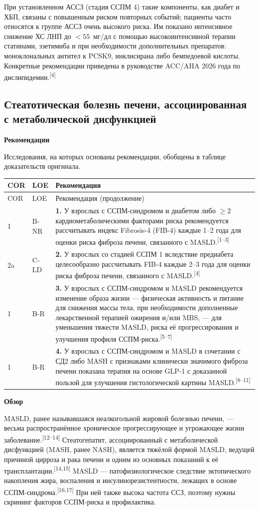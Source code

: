 \documentclass[11pt,a4paper]{article}
\newcommand{\src}[1]{\textsuperscript{[#1]}}
\newcommand{\heading}[1]{\par\medskip\textbf{#1}\par}
\begin{document}
При установленном АССЗ (стадия ССПМ 4) такие компоненты, как диабет и ХБП, связаны с повышенным риском повторных событий; пациенты часто относятся к группе АССЗ очень высокого риска. Им показано интенсивное снижение ХС ЛНП до $<55$~мг/дл с помощью высокоинтенсивной терапии статинами, эзетимиба и при необходимости дополнительных препаратов: моноклональных антител к PCSK9, инклисирана либо бемпедоевой кислоты. Конкретные рекомендации приведены в руководстве ACC/AHA 2026 года по дислипидемии.\src{4}

\subsection{Стеатотическая болезнь печени, ассоциированная с метаболической дисфункцией}
\heading{Рекомендации}
Исследования, на которых основаны рекомендации, обобщены в таблице доказательств оригинала.
{\small
\begin{longtable}{P{0.07\textwidth}P{0.11\textwidth}P{0.75\textwidth}}
\toprule COR & LOE & Рекомендация\\\midrule
\endfirsthead
\toprule COR & LOE & Рекомендация (продолжение)\\\midrule
{} & B-NR & \textbf{1.} У взрослых с ССПМ-синдромом и диабетом либо $\geq2$ кардиометаболическими факторами риска рекомендуется рассчитывать индекс Fibrosis-4 (FIB-4) каждые 1--2 года для оценки риска фиброза печени, связанного с MASLD.\src{1--3}\\[5pt]
2a & C-LD & \textbf{2.} У взрослых со стадией ССПМ 1 вследствие предиабета целесообразно рассчитывать FIB-4 каждые 2--3 года для оценки риска фиброза печени, связанного с MASLD.\src{4}\\[5pt]
1 & B-R & \textbf{3.} У взрослых с ССПМ-синдромом и MASLD рекомендуется изменение образа жизни --- физическая активность и питание для снижения массы тела, при необходимости дополненные лекарственной терапией ожирения и/или MBS, --- для уменьшения тяжести MASLD, риска её прогрессирования и улучшения профиля ССПМ-риска.\src{5--7}\\[5pt]
1 & B-R & \textbf{4.} У взрослых с ССПМ-синдромом и MASLD в сочетании с СД2 либо MASH с признаками клинически значимого фиброза печени показана терапия на основе GLP-1 с доказанной пользой для улучшения гистологической картины MASLD.\src{8--11}\\
\bottomrule
\end{longtable}
}

\heading{Обзор}
MASLD, ранее называвшаяся неалкогольной жировой болезнью печени, --- весьма распространённое хроническое прогрессирующее и угрожающее жизни заболевание.\src{12--14} Стеатогепатит, ассоциированный с метаболической дисфункцией (MASH, ранее NASH), является тяжёлой формой MASLD, ведущей причиной цирроза и рака печени и одним из основных показаний к её трансплантации.\src{14,15} MASLD --- патофизиологическое следствие эктопического накопления жира, воспаления и инсулинорезистентности, лежащих в основе ССПМ-синдрома.\src{16,17} При ней также высока частота ССЗ, поэтому нужны скрининг факторов ССПМ-риска и профилактика.
\end{document}
